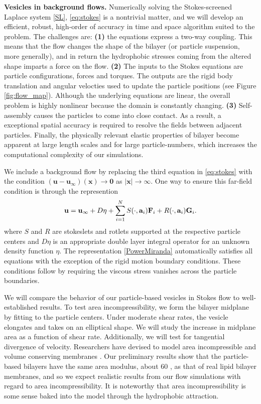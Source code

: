 \textbf{Vesicles in background flows.}
Numerically solving the Stokes-screened Laplace system \eqref{SL}, \eqref{eq:stokes} is a nontrivial matter,
and we will develop an efficient, robust, high-order of accuracy in time and space algorithm suited to the problem. 
The challenges are: \textbf{(1)} the equations express a two-way coupling.
This means that the flow changes the shape of the bilayer (or particle suspension, more generally),
and in return the hydrophobic stresses coming from the altered shape imparts a force on the flow. 
\textbf{(2)}
The inputs to the Stokes equations are particle configurations, forces and torques. 
The outputs are the rigid body translation and angular velocties used to update the particle positions (see Figure \ref{fig:flow_map}).
Although the underlying equations are linear, the overall problem is highly nonlinear because the domain is constantly changing.
\textbf{(3)} Self-assembly causes the particles to come into close contact.  
As a result, a exceptional spatial accuracy is required to resolve the fields between adjacent particles.
Finally, the physically relevant elastic properties of bilayer become apparent at large length scales and for large particle-numbers,
which increases the computational complexity of our simulations. 

We include a background flow by replacing the third equation in \eqref{eq:stokes} with the condition
$(\mathbf{u} - \mathbf{u}_{\infty})(\mathbf{x}) \to \mathbf{0}$ as $|\mathbf{x}| \to \infty.$ 
One way to ensure this far-field condition is through the represention 
\begin{equation}
\label{PowerMiranda}
{\bf u} = {\bf u}_{\infty} + D\eta + \sum_{i=1}^N S(\cdot, {\bf a}_i) {\bf F}_i + R(\cdot, {\bf a}_i) {\bf G}_i.
\end{equation}
where $S$ and $R$ are stokeslets and rotlets supported at the respective particle centers 
and $D\eta$ is an appropriate double layer integral operator for an unknown density function $\eta.$ 
The representation \eqref{PowerMiranda} automatically satisfies all equations with the exception of the rigid motion boundary conditions. 
These conditions follow by requiring the viscous stress vanishes across the particle boundaries.

We will compare the behavior of our particle-based vesicles in Stokes flow to well-established results.
To test area incompressibility, we form the bilayer midplane by fitting to the particle centers. Under moderate shear rates,
the vesicle elongates and takes on an elliptical shape. We will study the increase in midplane area as a function of shear rate.
Additionally, we will test for tangential divergence of velocity.
Researchers have devised to model area incompressible and
volume conserving membranes
\cite{torres-sanchez_millan_arroyo_2019, mahapatra_saintillan_rangamani_2020, Steigmann99, C6SM02452A}.
Our preliminary results show that the particle-based bilayers have the same area modulus, about 60 \kBT,  as that of real lipid bilayer membranes,
and so we expect realistic results from our flow simulations with regard to area incompressibility.  It is noteworthy that
area incompressibility is some sense baked into the model through the hydrophobic attraction. 

